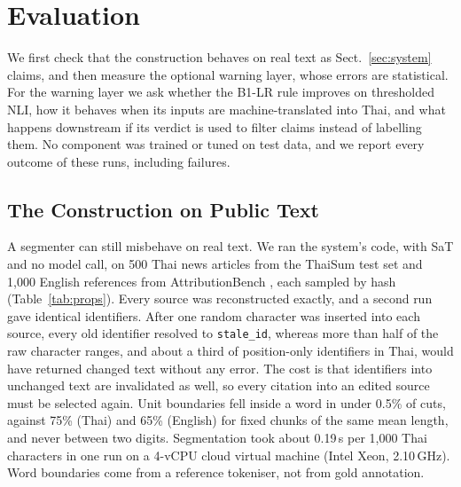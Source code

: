 \documentclass[runningheads]{llncs}
\begin{document}
\section{Evaluation}\label{sec:eval}

We first check that the construction behaves on real text as Sect.~\ref{sec:system} claims, and then
measure the optional warning layer, whose errors are statistical. For the warning layer we ask whether
the B1-LR rule improves on thresholded NLI, how it behaves when its inputs are machine-translated into
Thai, and what happens downstream if its verdict is used to filter claims instead of labelling them. No
component was
trained or tuned on test data, and we report every outcome of these runs, including failures.

\subsection{The Construction on Public Text}\label{sec:props}

A segmenter can still misbehave on real text. We ran the system's code, with SaT and no model call, on 500 Thai news articles from the
ThaiSum test set \cite{chumpolsathien2020thaisum} and 1,000 English references from AttributionBench
\cite{li2024attributionbench}, each sampled by hash (Table~\ref{tab:props}). Every source was
reconstructed exactly, and a second run gave identical identifiers. After one random character was
inserted into each source, every old identifier resolved to \texttt{stale\_id}, whereas more than half
of the raw character ranges, and about a third of position-only identifiers in Thai, would have returned changed
text without any error. The cost is that identifiers into unchanged text are invalidated as well, so every
citation into an edited source must be selected again. Unit boundaries fell inside a word in under 0.5\%
of cuts, against 75\% (Thai) and 65\% (English) for fixed chunks of the same mean length, and never
between two digits. Segmentation took about 0.19\,s per 1,000 Thai characters in one run on a 4-vCPU cloud virtual machine (Intel Xeon, 2.10\,GHz). Word boundaries
come from a reference tokeniser, not from gold annotation.
\end{document}
